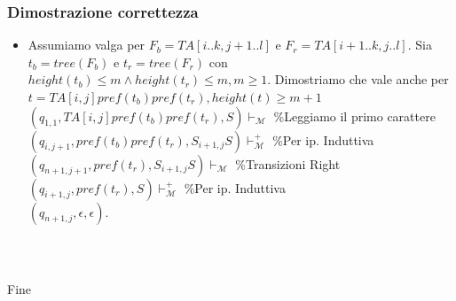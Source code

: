 \documentclass{beamer}
\begin{document}
\begin{frame}
\frametitle{Dimostrazione correttezza}

\begin{itemize}
\item Assumiamo valga per $F_b = TA[i..k,j+1..l]$ e $F_r = TA[i+1..k,j..l]$. Sia $t_b = tree(F_b)$ e $t_r = tree(F_r)$ con $height(t_b) \leq m \wedge height(t_r) \leq m, m \geq 1$. Dimostriamo che vale anche per $t = TA[i,j]pref(t_b)pref(t_r), height(t) \geq m+1$\\
$(q_{1,1},TA[i,j]pref(t_b)pref(t_r),S) \vdash_\mathcal{M} $     \tiny{\%Leggiamo il primo carattere}\normalsize\\ %

$(q_{i,j+1},pref(t_b)pref(t_r),S_{i+1,j}S) \vdash_\mathcal{M}^+ $    \tiny{\%Per ip. Induttiva}\normalsize\\ %
$(q_{n+1,j+1},pref(t_r),S_{i+1,j}S) \vdash_\mathcal{M} $                   \tiny{\%Transizioni Right}\normalsize\\ %
$(q_{i+1,j},pref(t_r),S) \vdash_\mathcal{M}^+ $                               \tiny{\%Per ip. Induttiva}\normalsize\\ %
$(q_{n+1,j},\epsilon,\epsilon)$.
\end{itemize}

\end{frame}


\begin{frame}
\frametitle{$\ $}
\Huge{\centerline{Fine}}
\end{frame}


\end{document}
